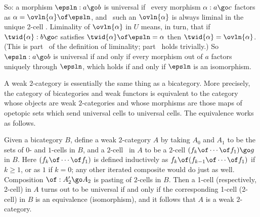 So: a morphism $\epsln: a \go b$ is universal if~ every
morphism $\alpha: a \go c$ factors as $\alpha = \ovln{\alpha} \of \epsln$,
and~ such an $\ovln{\alpha}$ is always liminal in the
unique 2-cell
%
.
%
Liminality of $\ovln{\alpha}$ in $U$ means, in turn, that if $\twid{\alpha}:
b \go c$ satisfies $\twid{\alpha} \of \epsln = \alpha$ then $\twid{\alpha} =
\ovln{\alpha}$.  (This is part~ of the definition of
liminality; part~ holds trivially.)  So $\epsln: a
\go b$ is universal if and only if every morphism out of $a$ factors uniquely
through $\epsln$, which holds if and only if $\epsln$ is an isomorphism.



A weak $2$-category is essentially the same thing as a bicategory.  More
precisely, the category of bicategories and weak functors is equivalent to
the category whose objects are weak $2$-categories and whose morphisms are
those maps of opetopic sets which send universal cells to universal cells.  
The equivalence works as follows.

Given a bicategory $B$, define a weak $2$-category $A$ by taking $A_0$ and
$A_1$ to be the sets of $0$- and $1$-cells in $B$, and a
$2$-cell~ in $A$ to be a $2$-cell $(f_k \of \cdots \of f_1)
\go g$ in $B$.  Here $(f_k \of \cdots \of f_1)$ is defined inductively as
$f_k \of (f_{k-1} \of\cdots\of f_1)$ if $k\geq 1$, or as $1$ if $k=0$; any
other iterated composite would do just as well.  Composition $\of: A'_2 \go
A_2$ is pasting of $2$-cells in $B$.  Then a 1-cell (respectively, 2-cell) in
$A$ turns out to be universal if and only if the corresponding 1-cell
(2-cell) in $B$ is an equivalence (isomorphism), and it follows that $A$ is a
weak $2$-category.


